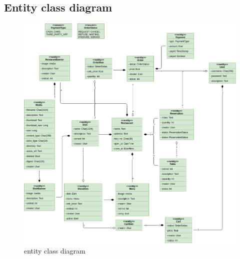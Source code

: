 \subsection{Entity class diagram}

\begin{figure}[!h]
    \begin{center}
        \includegraphics[scale=0.4]{Images/ClassDiagram/entity.png}
    \end{center}
    \hspace{0.3cm}
    \caption{entity class diagram}
\end{figure}